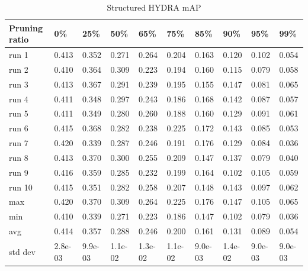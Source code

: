 \documentclass[journal,onecolumn,12pt]{IEEEtran}
\begin{document}
\begin{table}[htbp]
    \caption{Structured HYDRA mAP}
    \begin{center}
    \begin{tabular}{ |p{2cm}|p{1cm}|p{1cm}|p{1cm}|p{1cm}|p{1cm}|p{1cm}|p{1cm}|p{1cm}|p{1cm}|  }
     \hline
     Pruning ratio  & 0\% & 25\%& 50\%& 65\%& 75\%& 85\%& 90\%& 95\%& 99\%\\
     \hline
     run 1&0.413&0.352&0.271&0.264&0.204&0.163&0.120&0.102&0.054\\
     run 2&0.410&0.364&0.309&0.223&0.194&0.160&0.115&0.079&0.058\\
     run 3&0.413&0.367&0.291&0.239&0.195&0.155&0.147&0.081&0.065\\
     run 4&0.411&0.348&0.297&0.243&0.186&0.168&0.142&0.087&0.057\\
     run 5&0.411&0.349&0.280&0.260&0.188&0.160&0.129&0.091&0.061\\
     run 6&0.415&0.368&0.282&0.238&0.225&0.172&0.143&0.085&0.053\\
     run 7&0.420&0.339&0.287&0.246&0.191&0.176&0.129&0.084&0.036\\
     run 8&0.413&0.370&0.300&0.255&0.209&0.147&0.137&0.079&0.040\\
     run 9&0.416&0.359&0.285&0.232&0.199&0.164&0.102&0.105&0.059\\
     run 10&0.415&0.351&0.282&0.258&0.207&0.148&0.143&0.097&0.062\\
     \hline
        max     &0.420&0.370&0.309&0.264&0.225&0.176&0.147&0.105&0.065\\
        min     &0.410&0.339&0.271&0.223&0.186&0.147&0.102&0.079&0.036\\
        avg     &0.414&0.357&0.288&0.246&0.200&0.161&0.131&0.089&0.054\\
        std dev &2.8e-03&9.9e-03&1.1e-02&1.3e-02&1.1e-02&9.0e-03&1.4e-02&9.0e-03&9.0e-03\\
     \hline
    \end{tabular}
    \end{center}
    \label{tab:a4}
\end{table}
\end{document}
